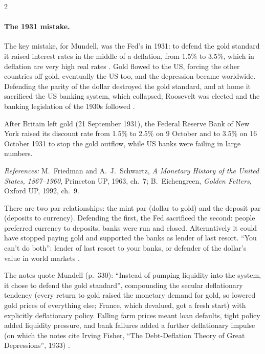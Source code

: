 \begin{paracol}{2}
\paragraph{The 1931 mistake.} The key mistake, for Mundell, was the Fed's in 1931: to defend the gold standard it raised interest rates in the middle of a
deflation, from 1.5\% to 3.5\%, which in deflation are very high real rates . Gold flowed to the US, forcing the
other countries off gold, eventually the US too, and the depression became worldwide. Defending the parity of the dollar destroyed the gold standard, and at
home it sacrificed the US banking system, which collapsed; Roosevelt was elected and the banking legislation of the 1930s followed .

\begin{history}
After Britain left gold (21 September 1931), the Federal Reserve Bank of New York raised its discount rate from 1.5\% to 2.5\% on 9 October and to 3.5\% on
16 October 1931 to stop the gold outflow, while US banks were failing in large numbers.\par
\emph{References:} M.~Friedman and A.~J.~Schwartz, \emph{A Monetary History of the United States, 1867--1960}, Princeton UP, 1963, ch.~7; B.~Eichengreen,
\emph{Golden Fetters}, Oxford UP, 1992, ch.~9.
\end{history}

\begin{intuition}
There are two par relationships: the mint par (dollar to gold) and the deposit par (deposits to currency). Defending the first, the Fed sacrificed the second:
people preferred currency to deposits, banks were run and closed. Alternatively it could have stopped paying gold and supported the banks as lender of last
resort. ``You can't do both'': lender of last resort to your banks, or defender of the dollar's value in world markets .
\end{intuition}

The notes quote Mundell (p.~330): ``Instead of pumping liquidity into the system, it chose to defend the gold standard'', compounding the secular deflationary tendency (every return to gold
raised the monetary demand for gold, so lowered gold prices of everything else; France, which devalued, got a fresh start) with explicitly deflationary policy. Falling farm prices meant loan
defaults, tight policy added liquidity pressure, and bank failures added a further deflationary impulse (on which the notes cite Irving Fisher, ``The Debt-Deflation Theory of Great Depressions'',
1933) .


\end{paracol}

